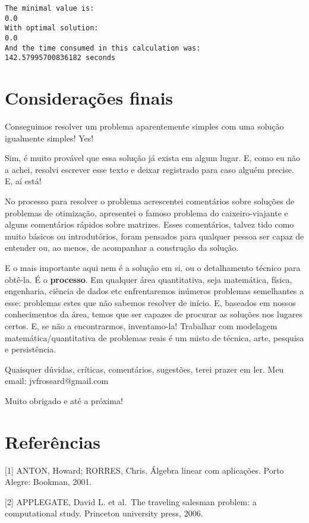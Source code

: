 \documentclass[11pt]{article}
\begin{document}
    \begin{Verbatim}[commandchars=\\\{\}]
The minimal value is:
0.0
With optimal solution:
0.0
And the time consumed in this calculation was:
142.57995700836182 seconds
    \end{Verbatim}

    \hypertarget{considerauxe7uxf5es-finais}{%
\section{Considerações finais}\label{considerauxe7uxf5es-finais}}

    Conseguimos resolver um problema aparentemente simples com uma solução
igualmente simples! Yes!

Sim, é muito provável que essa solução já exista em algum lugar. E, como
eu não a achei, resolvi escrever esse texto e deixar registrado para
caso alguém precise. E, aí está!

No processo para resolver o problema acrescentei comentários sobre
soluções de problemas de otimização, apresentei o famoso problema do
caixeiro-viajante e alguns comentários rápidos sobre matrizes. Esses
comentários, talvez tido como muito básicos ou introdutórios, foram
pensados para qualquer pessoa ser capaz de entender ou, ao menos, de
acompanhar a construção da solução.

E o mais importante aqui nem é a solução em si, ou o detalhamento
técnico para obtê-la. É o \textbf{processo}. Em qualquer área
quantitativa, seja matemática, física, engenharia, ciência de dados etc
enfrentaremos inúmeros problemas semelhantes a esse: problemas estes que
não sabemos resolver de início. E, baseados em nossos conhecimentos da
área, temos que ser capazes de procurar as soluções nos lugares certos.
E, se não a encontrarmos, inventamo-la! Trabalhar com modelagem
matemática/quantitativa de problemas reais é um misto de técnica, arte,
pesquisa e persistência.

Quaisquer dúvidas, críticas, comentários, sugestões, terei prazer em
ler. Meu email: jvfrossard@gmail.com

Muito obrigado e até a próxima!

    \hypertarget{referuxeancias}{%
\section{Referências}\label{referuxeancias}}

{[}1{]} ANTON, Howard; RORRES, Chris. Álgebra linear com aplicações.
Porto Alegre: Bookman, 2001.

{[}2{]} APPLEGATE, David L. et al.~The traveling salesman problem: a
computational study. Princeton university press, 2006.


    
    
    
\end{document}
